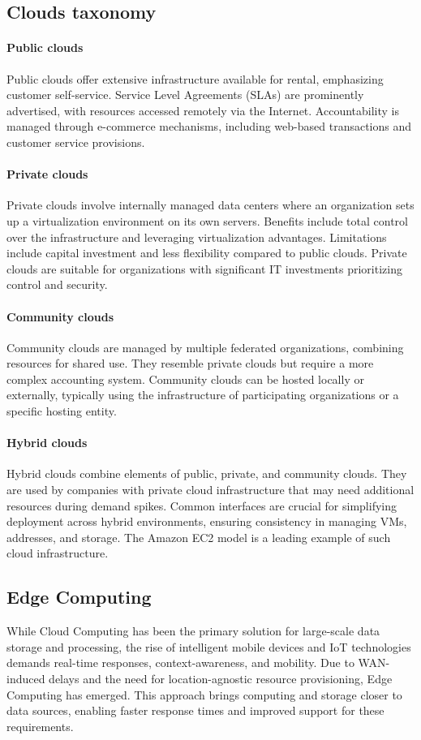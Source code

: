 \subsection{Clouds taxonomy}
\paragraph*{Public clouds}
Public clouds offer extensive infrastructure available for rental, emphasizing customer self-service. 
Service Level Agreements (SLAs) are prominently advertised, with resources accessed remotely via the Internet.
Accountability is managed through e-commerce mechanisms, including web-based transactions and customer service provisions.

\paragraph*{Private clouds}
Private clouds involve internally managed data centers where an organization sets up a virtualization environment on its own servers. 
Benefits include total control over the infrastructure and leveraging virtualization advantages.
Limitations include capital investment and less flexibility compared to public clouds.
Private clouds are suitable for organizations with significant IT investments prioritizing control and security.

\paragraph*{Community clouds}
Community clouds are managed by multiple federated organizations, combining resources for shared use. 
They resemble private clouds but require a more complex accounting system. 
Community clouds can be hosted locally or externally, typically using the infrastructure of participating organizations or a specific hosting entity.

\paragraph*{Hybrid clouds}
Hybrid clouds combine elements of public, private, and community clouds. 
They are used by companies with private cloud infrastructure that may need additional resources during demand spikes.
Common interfaces are crucial for simplifying deployment across hybrid environments, ensuring consistency in managing VMs, addresses, and storage.
The Amazon EC2 model is a leading example of such cloud infrastructure.

\subsection{Edge Computing}
While Cloud Computing has been the primary solution for large-scale data storage and processing, the rise of intelligent mobile devices and IoT technologies demands real-time responses, context-awareness, and mobility.
Due to WAN-induced delays and the need for location-agnostic resource provisioning, Edge Computing has emerged.
This approach brings computing and storage closer to data sources, enabling faster response times and improved support for these requirements.